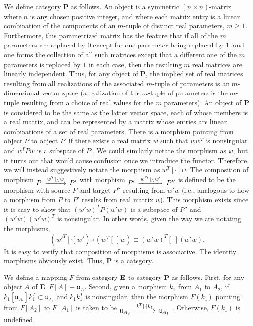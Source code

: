 \documentclass{amsart}
\numberwithin{equation}{section}
\theoremstyle{definition}
\numberwithin{theorem}{section}
\begin{document}
We define category {\bf P} as follows. An object is a symmetric $(n\times n)$-matrix where $n$ is any chosen positive integer, and where each matrix entry is a linear combination of the components of an $m$-tuple of distinct real parameters, $m\ge 1$.  Furthermore, this parametrized matrix has the feature that if all of the $m$ parameters are replaced by 0 except for one parameter being replaced by 1, and one forms the collection of all such matrices except that a different one of the $m$ parameters is replaced by $1$ in each case, then the resulting $m$ real matrices are linearly independent.  Thus, for any object of {\bf P}, the implied set of real matrices resulting from all realizations of the associated $m$-tuple of parameters is an $m$-dimensional vector space (a realization of the $m$-tuple of parameters is the $m$-tuple resulting from a choice of real values for the $m$ parameters).  An object of {\bf P} is considered to be the same as the latter vector space, each of whose members is a real matrix, and can be represented by a matrix whose entries are linear combinations of a set of real parameters.   There is a morphism pointing from object $P$ to object $P'$ if there exists a real matrix $w$ such that $ww^T$ is nonsingular and $w^TPw$ is a subspace of $P'$.  We could similarly notate the morphism as $w$, but it turns out that would cause confusion once we introduce the functor.  Therefore, we will instead suggestively notate the morphism as $w^T[\cdot]w$.    The composition of morphism $\begin{CD}  P @>w^T[\cdot]w>> P'\end{CD}$ with morphism $\begin{CD}  P' @>w'^T[\cdot]w'>> P''\end{CD}$ is defined to be the morphism with source $P$ and target $P''$ resulting from $w'w$ (i.e., analogous to how a morphism from $P$ to $P'$ results from real matrix $w$).  This morphism exists since it is easy to show that $(w'w)^TP(w'w)$ is a subspace of $P''$ and $(w'w)(w'w)^T$ is nonsingular. In other words, given the way we are notating the morphisms, \begin{equation}\label{2/22/25.1}(w'^T[\cdot]w')\circ (w^T[\cdot]w) \equiv (w'w)^T[\cdot](w'w).\end{equation} It is easy to verify that composition of morphisms is associative. The identity morphisms obviously exist. Thus, {\bf P} is a category.

We define a mapping $F$ from category ${\bf E}$ to category {\bf P} as follows.  First, for any object $A$ of {\bf E}, $F[
A] \equiv \mathfrak{u}_A$.  Second, given a morphism $k_1$ from $A_1$ to $A_2$, if $k_1[\mathfrak{u}_{A_2}]k_1^T \subset \mathfrak{u}_{A_1}$ and $k_1k_1^T$ is nonsingular, then the morphism $F(k_1)$ pointing from $F[A_2]$ to $F[A_1]$ is taken to be $\begin{CD}  \mathfrak{u}_{A_2} @>k_1^T[\cdot]k_1>> \mathfrak{u}_{A_1}\end{CD}$ .  Otherwise, $F(k_1)$ is undefined.
\end{document}
